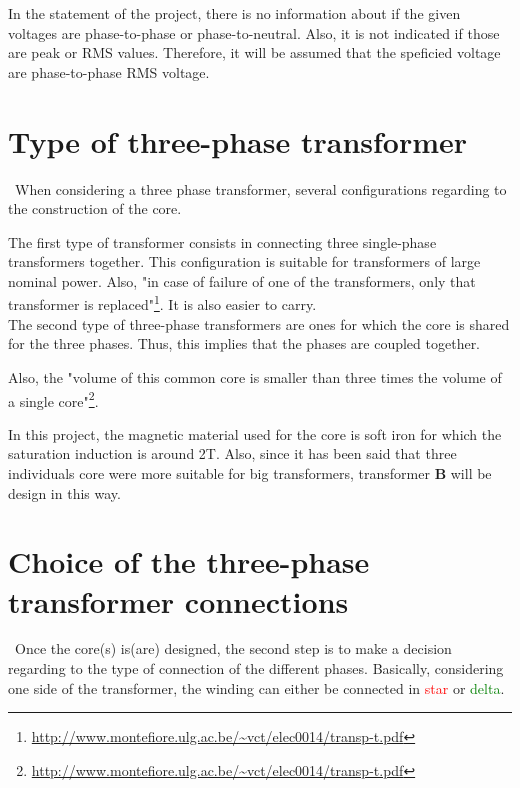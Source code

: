 \documentclass[12pt,a4paper]{report}
\begin{document}
In the statement of the project, there is no information about if the given voltages are phase-to-phase or phase-to-neutral. Also, it is not indicated if those are peak or RMS values. Therefore, it will be assumed that the speficied voltage are phase-to-phase RMS voltage.
\section{Type of three-phase transformer}
\quad\, When considering a three phase transformer, several configurations regarding to the construction of the core.

The first type of transformer consists in connecting three single-phase transformers together. This configuration is suitable for transformers of large nominal power. Also, "in case of failure of one of the transformers, only that transformer is replaced"\footnote{\url{http://www.montefiore.ulg.ac.be/~vct/elec0014/transp-t.pdf}}. It is also easier to carry.\\

The second type of three-phase transformers are ones for which the core is shared for the three phases. Thus, this implies that the phases are coupled together.

Also, the "volume of this common core is smaller than three times the volume of a single core"\footnote{\url{http://www.montefiore.ulg.ac.be/~vct/elec0014/transp-t.pdf}}.

In this project, the magnetic material used for the core is soft iron for which the saturation induction is around 2T. Also, since it has been said that three individuals core were more suitable for big transformers, transformer \textbf{B} will be design in this way.

\section{Choice of the three-phase transformer connections}
\quad\, Once the core(s) is(are) designed, the second step is to make a decision regarding to the type of connection of the different phases. Basically, considering one side of the transformer, the winding can either be connected in \textcolor{red}{star} or \textcolor{green}{delta}.
\end{document}
